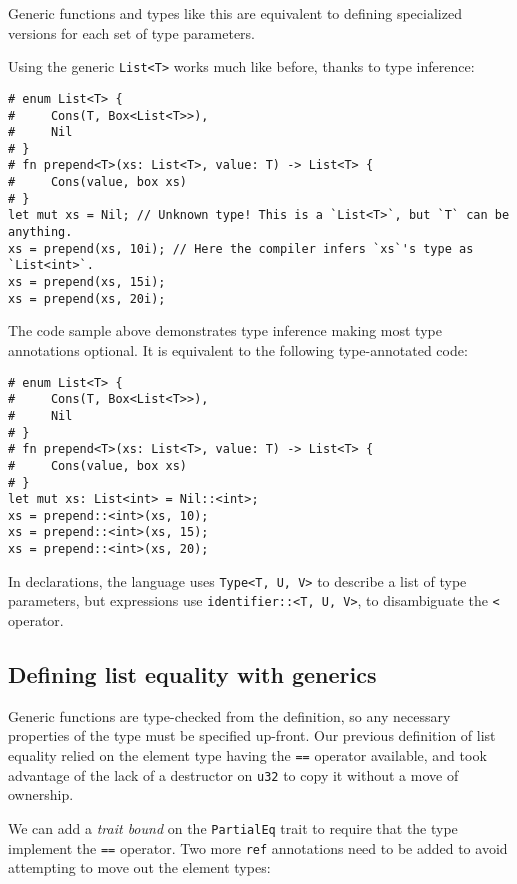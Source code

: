 \documentclass[]{article}
\begin{document}
Generic functions and types like this are equivalent to defining
specialized versions for each set of type parameters.

Using the generic \texttt{List\textless{}T\textgreater{}} works much
like before, thanks to type inference:

\begin{verbatim}
# enum List<T> {
#     Cons(T, Box<List<T>>),
#     Nil
# }
# fn prepend<T>(xs: List<T>, value: T) -> List<T> {
#     Cons(value, box xs)
# }
let mut xs = Nil; // Unknown type! This is a `List<T>`, but `T` can be anything.
xs = prepend(xs, 10i); // Here the compiler infers `xs`'s type as `List<int>`.
xs = prepend(xs, 15i);
xs = prepend(xs, 20i);
\end{verbatim}

The code sample above demonstrates type inference making most type
annotations optional. It is equivalent to the following type-annotated
code:

\begin{verbatim}
# enum List<T> {
#     Cons(T, Box<List<T>>),
#     Nil
# }
# fn prepend<T>(xs: List<T>, value: T) -> List<T> {
#     Cons(value, box xs)
# }
let mut xs: List<int> = Nil::<int>;
xs = prepend::<int>(xs, 10);
xs = prepend::<int>(xs, 15);
xs = prepend::<int>(xs, 20);
\end{verbatim}

In declarations, the language uses
\texttt{Type\textless{}T, U, V\textgreater{}} to describe a list of type
parameters, but expressions use
\texttt{identifier::\textless{}T, U, V\textgreater{}}, to disambiguate
the \texttt{\textless{}} operator.

\subsection{Defining list equality with
generics}\label{defining-list-equality-with-generics}

Generic functions are type-checked from the definition, so any necessary
properties of the type must be specified up-front. Our previous
definition of list equality relied on the element type having the
\texttt{==} operator available, and took advantage of the lack of a
destructor on \texttt{u32} to copy it without a move of ownership.

We can add a \emph{trait bound} on the \texttt{PartialEq} trait to
require that the type implement the \texttt{==} operator. Two more
\texttt{ref} annotations need to be added to avoid attempting to move
out the element types:
\end{document}
